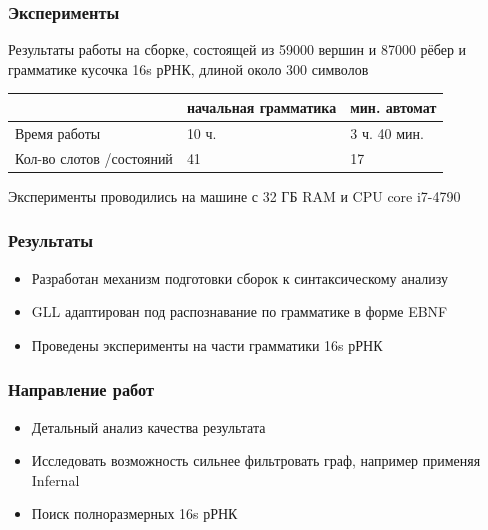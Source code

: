 \documentclass{beamer}
\begin{document}
    \begin{frame}
        \frametitle{Эксперименты}
        Результаты работы на сборке, состоящей из 59000 вершин и 87000 рёбер
        и грамматике кусочка 16s рРНК, длиной около 300 символов
        \begin{center}
            \begin{tabular}{ p{2.5cm} | p{2cm} | p{2.5cm}}
                & начальная грамматика & мин. автомат \\ \hline
                Время работы                & 10 ч.                & 3 ч. 40 мин. \\ \hline
                Кол-во слотов /состояний    & 41                   & 17           \\ \hline
            \end{tabular}
        \end{center}
        Эксперименты проводились на машине с 32 ГБ RAM и CPU core i7-4790
    \end{frame}
    
    \begin{frame}
        \frametitle{Результаты}
        \begin{itemize}
            \item Разработан механизм подготовки сборок к синтаксическому анализу
            \item GLL адаптирован под распознавание по грамматике в форме EBNF
            \item Проведены эксперименты на части грамматики 16s рРНК
        \end{itemize}
    \end{frame}
    
    \begin{frame}
        \frametitle{Направление работ}
        \begin{itemize}
            \item Детальный анализ качества результата
            \item Исследовать возможность сильнее фильтровать граф, например применяя Infernal 
            \item Поиск полноразмерных 16s рРНК
        \end{itemize}
    \end{frame}
\end{document}
